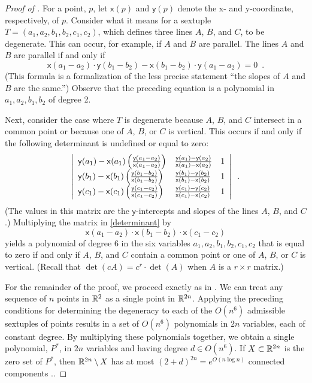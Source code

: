 \documentclass{patmorin}
\newcommand{\x}{\mathsf{x}}
\newcommand{\y}{\mathsf{y}}
\begin{document}
\begin{proof}[Proof of ]
   For a point, $p$, let $\x(p)$ and $\y(p)$ denote the x- and
   y-coordinate, respectively, of $p$.  Consider what it means for a
   sextuple $T=(a_1,a_2,b_1,b_2,c_1,c_2)$, which defines three lines
   $A$, $B$, and $C$, to be degenerate.  This can occur, for example,
   if $A$ and $B$ are parallel.  The lines $A$ and $B$ are parallel if
   and only if
   \[
      \x(a_1-a_2)\cdot \y(b_1-b_2) - 
       \x(b_1-b_2)\cdot \y(a_1-a_2) = 0 \enspace .
   \]
   (This formula is a formalization of the less precise statement
   ``the slopes of $A$ and $B$ are the same.'')
   Observe that the preceding equation is a polynomial in
   $a_1,a_2,b_1,b_2$ of degree 2.

   Next, consider the case where $T$ is degenerate because $A$, $B$, and
   $C$ intersect in a common point or because one of $A$, $B$, or $C$
   is vertical.  This occurs if and only if the following determinant
   is undefined or equal to zero:
   \begin{equation}
   \left|\begin{array}{lll}
   \y(a_1)-\x(a_1)\left(\frac{\y(a_1-a_2)}{\x(a_1-a_2)}\right) & \frac{\y(a_1)-\y(a_2)}{\x(a_1)-\x(a_2)} & 1 \\
   \y(b_1)-\x(b_1)\left(\frac{\y(b_1-b_2)}{\x(b_1-b_2)}\right) & \frac{\y(b_1)-\y(b_2)}{\x(b_1)-\x(b_2)}  & 1 \\
   \y(c_1)-\x(c_1)\left(\frac{\y(c_1-c_2)}{\x(c_1-c_2)}\right) & \frac{\y(c_1)-\y(c_2)}{\x(c_1)-\x(c_2)}  & 1 \\
   \end{array}\right| \enspace .
   \eqlabel{determinant}
   \end{equation}
   (The values in this matrix are the $\y$-intercepts and slopes of the
   lines $A$, $B$, and $C$.)
   Multiplying the matrix in \eqref{determinant} by 
   \[
      \x(a_1-a_2)\cdot
      \x(b_1-b_2)\cdot
      \x(c_1-c_2)
   \]
   yields a polynomial of degree $6$ in the six variables
   $a_1,a_2,b_1,b_2,c_1,c_2$ that is equal to zero if and only if $A$,
   $B$, and $C$ contain a common point or one of $A$, $B$, or $C$
   is vertical. (Recall that $\det(cA)=c^r\cdot\det(A)$ when $A$ is a
   $r\times r$ matrix.)

   For the remainder of the proof, we proceed exactly as in
   \cite{goodman.pollack:upper}.  We can treat any sequence of $n$
   points in $\mathbb{R}^2$ as a single point in $\mathbb{R}^{2n}$.  Applying the
   preceding conditions for determining the degeneracy to each of
   the $O(n^6)$ admissible sextuples of points results in a set of
   $O(n^6)$ polynomials in $2n$ variables, each of constant degree.
   By multiplying these polynomials together, we obtain a single
   polynomial, $P^*$, in $2n$ variables and having degree $d\in O(n^6)$.
   If $X\subset\mathbb{R}^{2n}$ is the zero set of $P^*$, then $\mathbb{R}^{2n}\setminus
   X$ has at most $(2+d)^{2n}=e^{O(n\log n)}$ connected components
   \cite[Lemma~2]{goodman.pollack:upper}..


\end{proof}
\end{document}
